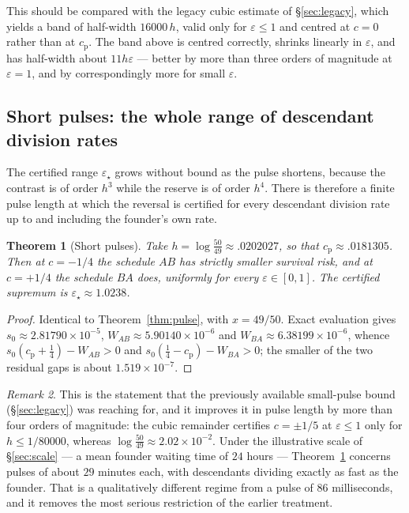 \documentclass[11pt]{article}
\theoremstyle{plain}
\newtheorem{theorem}{Theorem}
\theoremstyle{definition}
\theoremstyle{remark}
\newtheorem{remark}[theorem]{Remark}
\newcommand{\eps}{\varepsilon}
\newcommand{\cp}{c_{\mathrm p}}
\begin{document}
This should be compared with the legacy cubic estimate of
\S\ref{sec:legacy}, which yields a band of half-width $16000\,h$, valid only
for $\eps\le1$ and centred at $c=0$ rather than at $\cp$. The band above is
centred correctly, shrinks linearly in $\eps$, and has half-width about
$11h\eps$ --- better by more than three orders of magnitude at $\eps=1$, and by
correspondingly more for small $\eps$.

\subsection{Short pulses: the whole range of descendant division rates}

The certified range $\eps_\star$ grows without bound as the pulse shortens,
because the contrast is of order $h^3$ while the reserve is of order $h^4$.
There is therefore a finite pulse length at which the reversal is certified for
every descendant division rate up to and including the founder's own rate.

\begin{theorem}[Short pulses]\label{thm:short}
Take $h=\log\frac{50}{49}\approx.0202027$, so that $\cp\approx.0181305$. Then
at $c=-1/4$ the schedule $AB$ has strictly smaller survival risk, and at
$c=+1/4$ the schedule $BA$ does, uniformly for \emph{every} $\eps\in[0,1]$. The
certified supremum is $\eps_\star\approx1.0238$.
\end{theorem}

\begin{proof}
Identical to Theorem~\ref{thm:pulse}, with $x=49/50$. Exact evaluation gives
$s_0\approx2.81790\times10^{-5}$, $W_{AB}\approx5.90140\times10^{-6}$ and
$W_{BA}\approx6.38199\times10^{-6}$, whence
$s_0(\cp+\tfrac14)-W_{AB}>0$ and $s_0(\tfrac14-\cp)-W_{BA}>0$; the smaller of
the two residual gaps is about $1.519\times10^{-7}$.
\end{proof}

\begin{remark}
This is the statement that the previously available small-pulse bound
(\S\ref{sec:legacy}) was reaching for, and it improves it in pulse length by
more than four orders of magnitude: the cubic remainder certifies $c=\pm1/5$ at
$\eps\le1$ only for $h\le1/80000$, whereas $\log\frac{50}{49}\approx2.02\times10^{-2}$.
Under the illustrative scale of \S\ref{sec:scale} --- a mean founder waiting
time of $24$ hours --- Theorem~\ref{thm:short} concerns pulses of about $29$
minutes each, with descendants dividing exactly as fast as the founder. That is
a qualitatively different regime from a pulse of $86$ milliseconds, and it
removes the most serious restriction of the earlier treatment.
\end{remark}
\end{document}
